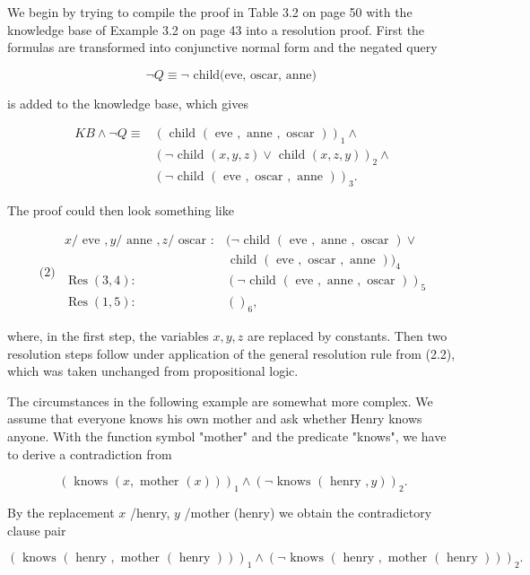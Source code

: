 \documentclass[10pt]{article}
\begin{document}
We begin by trying to compile the proof in Table 3.2 on page 50 with the knowledge base of Example 3.2 on page 43 into a resolution proof. First the formulas are transformed into conjunctive normal form and the negated query

$$
\neg Q \equiv \neg \text { child(eve, oscar, anne) }
$$

is added to the knowledge base, which gives

$$
\begin{aligned}
K B \wedge \neg Q \equiv & (\text { child }(\text { eve }, \text { anne }, \text { oscar }))_{1} \wedge \\
& (\neg \text { child }(x, y, z) \vee \text { child }(x, z, y))_{2} \wedge \\
& (\neg \text { child }(\text { eve }, \text { oscar }, \text { anne }))_{3} .
\end{aligned}
$$

The proof could then look something like

$$
\text { (2) } \begin{aligned}
x / \text { eve }, y / \text { anne }, z / \text { oscar }: & (\neg \text { child }(\text { eve }, \text { anne }, \text { oscar }) \vee \\
& \text { child }(\text { eve }, \text { oscar }, \text { anne }))_{4} \\
\operatorname{Res}(3,4): & (\neg \text { child }(\text { eve }, \text { anne }, \text { oscar }))_{5} \\
\operatorname{Res}(1,5): & ()_{6},
\end{aligned}
$$

where, in the first step, the variables $x, y, z$ are replaced by constants. Then two resolution steps follow under application of the general resolution rule from (2.2), which was taken unchanged from propositional logic.

The circumstances in the following example are somewhat more complex. We assume that everyone knows his own mother and ask whether Henry knows anyone. With the function symbol "mother" and the predicate "knows", we have to derive a contradiction from

$$
(\text { knows }(x, \text { mother }(x)))_{1} \wedge(\neg \text { knows }(\text { henry }, y))_{2} .
$$

By the replacement $x$ /henry, $y$ /mother (henry) we obtain the contradictory clause pair

$$
(\text { knows }(\text { henry }, \text { mother }(\text { henry })))_{1} \wedge(\neg \text { knows }(\text { henry }, \text { mother }(\text { henry })))_{2} .
$$
\end{document}
